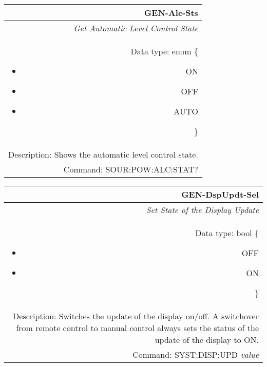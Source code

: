 \documentclass[openany]{article}
\begin{document}
		\begin{tabular}{N}
			\hline
			\bfseries GEN-Alc-Sts \\ \hline
			\emph{Get Automatic Level Control State} \\
			Data type: enum \{\begin{itemize}[noitemsep]
				\small
				\item[] ON
				\item[] OFF
				\item[] AUTO
			\end{itemize}\} \\
			Description: Shows the automatic level control state. \\
			Command: SOUR:POW:ALC:STAT? \\

		\end{tabular}
%
		\begin{tabular}{N}
			\hline
			\bfseries GEN-DspUpdt-Sel \\ \hline
			\emph{Set State of the Display Update} \\
			Data type: bool \{\begin{itemize}[noitemsep]
				\small
				\item[] OFF
				\item[] ON
			\end{itemize}\} \\
			Description: Switches the update of the display on/off. A switchover from remote control to manual control always sets the status of the update of the display to ON. \\
			Command: SYST:DISP:UPD \emph{value} \\

		\end{tabular}
\end{document}
